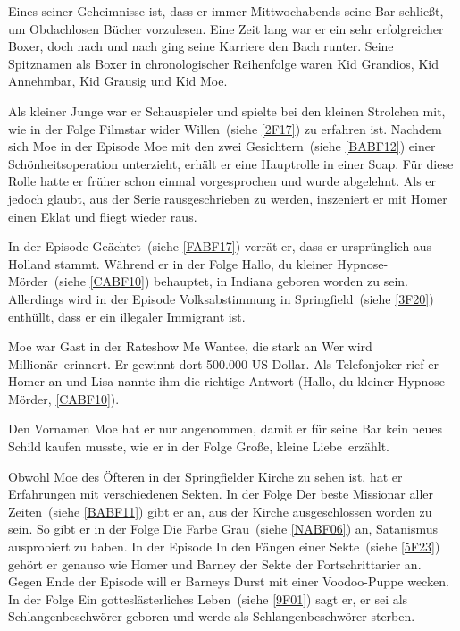 {Eines seiner Geheimnisse ist, dass er immer Mittwochabends seine Bar schließt, um Obdachlosen Bücher vorzulesen. Eine Zeit lang war er ein sehr erfolgreicher Boxer, doch nach und nach ging seine Karriere den Bach runter. Seine Spitznamen als Boxer in chronologischer Reihenfolge waren Kid Grandios, Kid Annehmbar, Kid Grausig und Kid Moe.

Als kleiner Junge war er Schauspieler und spielte bei den kleinen Strolchen mit, wie in der Folge \glqq Filmstar wider Willen\grqq\ (siehe \ref{2F17}) zu erfahren ist. Nachdem sich Moe in der Episode \glqq Moe mit den zwei Gesichtern\grqq\ (siehe \ref{BABF12}) einer Schönheitsoperation unterzieht, erhält er eine Hauptrolle in einer Soap. Für diese Rolle hatte er früher schon einmal vorgesprochen und wurde abgelehnt. Als er jedoch glaubt, aus der Serie rausgeschrieben zu werden, inszeniert er mit Homer einen Eklat und fliegt wieder raus. 

In der Episode \glqq Geächtet\grqq\ (siehe \ref{FABF17}) verrät er, dass er ursprünglich aus Holland stammt. Während er in der Folge \glqq Hallo, du kleiner Hypnose-Mörder\grqq\ (siehe \ref{CABF10}) behauptet, in Indiana geboren worden zu sein. Allerdings wird in der Episode \glqq Volksabstimmung in Springfield\grqq\ (siehe \ref{3F20}) enthüllt, dass er ein illegaler Immigrant ist.

Moe war Gast in der Rateshow \glqq Me Wantee\grqq , die stark an \glqq Wer wird Millionär\grqq\ erinnert. Er gewinnt dort 500.000 US Dollar. Als Telefonjoker rief er Homer an und Lisa nannte ihm die richtige Antwort (\glqq Hallo, du kleiner Hypnose-Mörder\grqq , \ref{CABF10}).

Den Vornamen Moe hat er nur angenommen, damit er für seine Bar kein neues Schild kaufen musste, wie er in der Folge \glqq Große, kleine Liebe\grqq\ erzählt.

Obwohl Moe des Öfteren in der Springfielder Kirche zu sehen ist, hat er Erfahrungen mit verschiedenen Sekten. In der Folge \glqq Der beste Missionar aller Zeiten\grqq\ (siehe \ref{BABF11}) gibt er an, aus der Kirche ausgeschlossen worden zu sein. So gibt er in der Folge \glqq Die Farbe Grau\grqq\ (siehe \ref{NABF06}) an, Satanismus ausprobiert zu haben. In der Episode \glqq In den Fängen einer Sekte\grqq\ (siehe \ref{5F23}) gehört er genauso wie Homer und Barney der Sekte der Fortschrittarier an. Gegen Ende der Episode will er Barneys Durst mit einer Voodoo-Puppe wecken. In der Folge \glqq Ein gotteslästerliches Leben\grqq\ (siehe \ref{9F01}) sagt er, er sei als Schlangenbeschwörer geboren und werde als Schlangenbeschwörer sterben.

}
